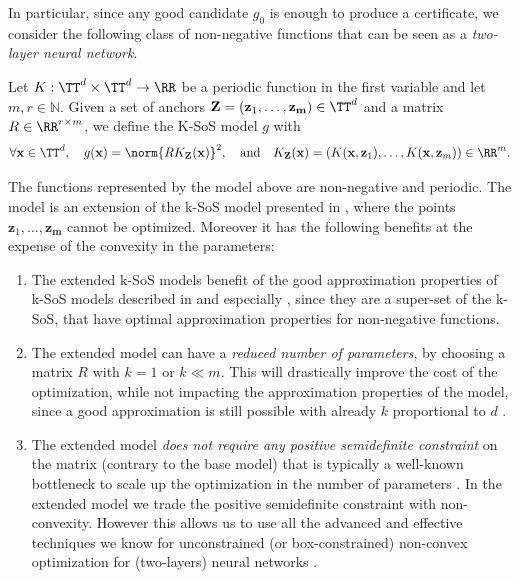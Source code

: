 \documentclass{article}
\begin{document}
In particular, since any good candidate $g_0$ is enough to produce a certificate, we consider the following class of non-negative functions that can be seen as a {\em two-layer neural network}.

\begin{definition}\label{def:ksos-torus}
  Let $K: \TT^d \times \TT^d \to \RR$ be a periodic function in the first variable and let $m, r \in \mathbb{N}$. Given a set of anchors $\mathbf{Z} = (\mathbf{z}_1, \dots, \mathbf{z_m}) \in \TT^d$ and a matrix $R \in \RR^{r \times m}$, we define the K-SoS model $g$ with
  \begin{equation}\label{eq:def-ksos-torus}
    \forall \mathbf{x} \in \TT^d, \quad g(\mathbf{x}) = \norm{R K_\mathbf{Z}(\mathbf{x})}^2, \quad \textrm{and} \quad K_\mathbf{Z}(\mathbf{x}) = (K(\mathbf{x},\mathbf{z}_1), \dots, K(\mathbf{x},\mathbf{z}_m)) \in \RR^m.
  \end{equation}
\end{definition}

The functions represented by the model above are non-negative and periodic.
The model is an extension of the k-SoS model presented in \cite{marteau-fereyNonparametricModelsNonnegative2020}, where the points $\mathbf{z}_1, \dots, \mathbf{z_m}$ cannot be optimized. Moreover it has the following benefits at the expense of the convexity in the parameters:
\begin{enumerate}
  \item The extended k-SoS models benefit of the good approximation properties of k-SoS models described in \cite{marteau-fereyNonparametricModelsNonnegative2020} and especially \cite{rudiPSDRepresentationsEffective2021}, since they are a super-set of the k-SoS, that have optimal approximation properties for non-negative functions.
  \item The extended model can have a {\em reduced number of parameters}, by choosing a matrix $R$ with $k = 1$ or $k \ll m$. This will drastically improve the cost of the optimization, while not impacting the approximation properties of the model, since a good approximation is still possible with already $k$ proportional to $d$ \cite[see Thm. 3]{rudiFindingGlobalMinima2020}.
  \item The extended model {\em does not require any positive semidefinite constraint} on the matrix (contrary to the base model) that is typically a well-known bottleneck to scale up the optimization in the number of parameters \cite{marteau-fereyNonparametricModelsNonnegative2020}. In the extended model we trade the positive semidefinite constraint with non-convexity. However this allows us to use all the advanced and effective  techniques we know for unconstrained (or box-constrained) non-convex optimization for (two-layers) neural networks \cite{goodfellow2016deep}.
\end{enumerate}
\end{document}
